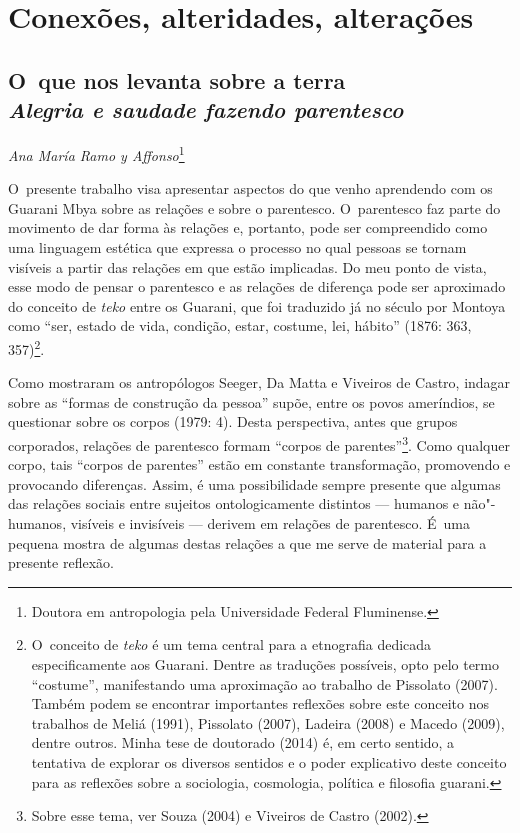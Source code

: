\makeatletter\@openrightfalse
\movetooddpage
\part{Conexões, alteridades, alterações}
 


\chapter*{O~que nos levanta sobre a terra\\
\large{\emph{Alegria e saudade fazendo parentesco}}}


\@openrighttrue\makeatother
\begin{flushright}
\emph{Ana María Ramo y Affonso}\footnote{Doutora em antropologia pela
Universidade Federal Fluminense.}
\end{flushright}

\noindent
O~presente trabalho visa apresentar aspectos do que venho aprendendo com
os Guarani Mbya sobre as relações e sobre o parentesco. O~parentesco
faz parte do movimento de dar forma às relações e, portanto, pode ser
compreendido como uma linguagem estética que expressa o processo no
qual pessoas se tornam visíveis a partir das relações em que estão
implicadas. Do meu ponto de vista, esse modo de pensar o parentesco e
as relações de diferença pode ser aproximado do conceito de \emph{teko} entre
os Guarani, que foi traduzido já no século  por Montoya como ``ser,
estado de vida, condição, estar, costume, lei, hábito'' (1876: 363,
357)\footnote{O~conceito de \emph{teko} é um tema central para a etnografia
dedicada especificamente aos Guarani. Dentre as traduções possíveis,
opto pelo termo ``costume'', manifestando uma aproximação ao trabalho de
Pissolato (2007). Também podem se encontrar importantes reflexões sobre
este conceito nos trabalhos de Meliá (1991), Pissolato (2007), Ladeira
(2008) e Macedo (2009), dentre outros. Minha tese de doutorado (2014)
é, em certo sentido, a tentativa de explorar os diversos sentidos e o
poder explicativo deste conceito para as reflexões sobre a sociologia,
cosmologia, política e filosofia guarani.}.

Como mostraram os antropólogos Seeger, Da Matta e Viveiros de Castro,
indagar sobre as ``formas de construção da pessoa'' supõe, entre os povos
ameríndios, se questionar sobre os corpos (1979: 4). Desta perspectiva,
antes que grupos corporados, relações de parentesco formam ``corpos de
parentes''\footnote{Sobre
esse tema, ver Souza (2004) e Viveiros de Castro (2002).}. Como
qualquer corpo, tais ``corpos de parentes'' estão em constante
transformação, promovendo e provocando diferenças. Assim, é uma
possibilidade sempre presente que algumas das relações sociais entre
sujeitos ontologicamente distintos --- humanos e não"-humanos, visíveis e
invisíveis --- derivem em relações de parentesco. É~uma pequena mostra de
algumas destas relações a que me serve de material para a presente
reflexão.

